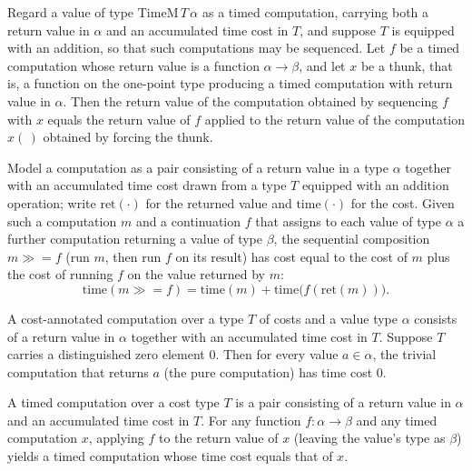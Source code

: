 \begin{theorem}
\label{TimeM.ret_seq}
\leanok
{}
Regard a value of type $\mathrm{TimeM}\,T\,\alpha$ as a timed computation, carrying both
a return value in $\alpha$ and an accumulated time cost in $T$, and suppose $T$ is
equipped with an addition, so that such computations may be sequenced. Let $f$ be a
timed computation whose return value is a function $\alpha \to \beta$, and let $x$ be a
thunk, that is, a function on the one-point type producing a timed computation with
return value in $\alpha$. Then the return value of the computation obtained by
sequencing $f$ with $x$ equals the return value of $f$ applied to the return value of
the computation $x(\,)$ obtained by forcing the thunk.
\end{theorem}

\begin{theorem}
\label{TimeM.time_bind}
\leanok
{}
Model a computation as a pair consisting of a return value in a type $\alpha$ together
with an accumulated time cost drawn from a type $T$ equipped with an addition operation;
write $\mathrm{ret}(\cdot)$ for the returned value and $\mathrm{time}(\cdot)$ for the
cost. Given such a computation $m$ and a continuation $f$ that assigns to each value of
type $\alpha$ a further computation returning a value of type $\beta$, the sequential
composition $m \gg\!= f$ (run $m$, then run $f$ on its result) has cost equal to the
cost of $m$ plus the cost of running $f$ on the value returned by $m$: \[
\mathrm{time}(m \gg\!= f) = \mathrm{time}(m) +
\mathrm{time}\bigl(f(\mathrm{ret}(m))\bigr). \]
\end{theorem}

\begin{theorem}
\label{TimeM.time_pure}
\leanok
{}
A cost-annotated computation over a type $T$ of costs and a value type $\alpha$ consists
of a return value in $\alpha$ together with an accumulated time cost in $T$. Suppose $T$
carries a distinguished zero element $0$. Then for every value $a \in \alpha$, the
trivial computation that returns $a$ (the $\mathrm{pure}$ computation) has time cost
$0$.
\end{theorem}

\begin{theorem}
\label{TimeM.time_map}
\leanok
{}
A timed computation over a cost type $T$ is a pair consisting of a return value in
$\alpha$ and an accumulated time cost in $T$. For any function $f\colon \alpha \to
\beta$ and any timed computation $x$, applying $f$ to the return value of $x$ (leaving
the value's type as $\beta$) yields a timed computation whose time cost equals that of
$x$.
\end{theorem}

